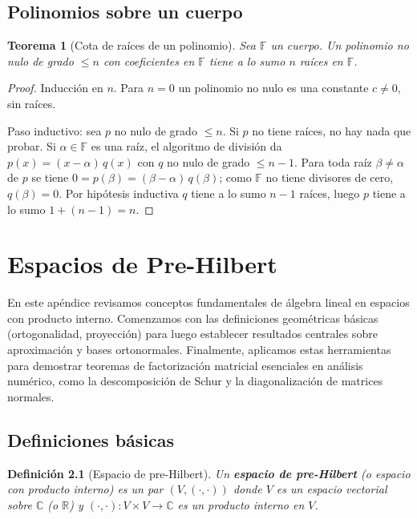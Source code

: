 \documentclass[a4paper,11pt]{report}
\newtheorem{theorem}{Teorema}[chapter]
\newtheorem{definition}[theorem]{Definición}
\begin{document}
\section{Polinomios sobre un cuerpo}

\begin{theorem}[Cota de raíces de un polinomio]\label{thm:raices_polinomio}
Sea $\mathbb{F}$ un cuerpo.  Un polinomio no nulo de grado $\leq n$ con coeficientes en $\mathbb{F}$ tiene a lo sumo $n$ raíces en $\mathbb{F}$.
\end{theorem}

\begin{proof}
Inducción en $n$.  Para $n=0$ un polinomio no nulo es una constante $c\neq 0$, sin raíces.

Paso inductivo: sea $p$ no nulo de grado $\leq n$.  Si $p$ no tiene raíces, no hay nada que probar.  Si $\alpha\in\mathbb{F}$ es una raíz, el algoritmo de división da $p(x)=(x-\alpha)\,q(x)$ con $q$ no nulo de grado $\leq n-1$.  Para toda raíz $\beta\neq\alpha$ de $p$ se tiene $0=p(\beta)=(\beta-\alpha)\,q(\beta)$; como $\mathbb{F}$ no tiene divisores de cero, $q(\beta)=0$.  Por hipótesis inductiva $q$ tiene a lo sumo $n-1$ raíces, luego $p$ tiene a lo sumo $1+(n-1)=n$.
\end{proof}


\chapter{Espacios de Pre-Hilbert}

En este apéndice revisamos conceptos fundamentales de álgebra lineal en espacios con producto interno. Comenzamos con las definiciones geométricas básicas (ortogonalidad, proyección) para luego establecer resultados centrales sobre aproximación y bases ortonormales. Finalmente, aplicamos estas herramientas para demostrar teoremas de factorización matricial esenciales en análisis numérico, como la descomposición de Schur y la diagonalización de matrices normales.

\section{Definiciones básicas}

\begin{definition}[Espacio de pre-Hilbert]
Un \textbf{espacio de pre-Hilbert} (o espacio con producto interno) es un par $(V, (\cdot,\cdot))$ donde $V$ es un espacio vectorial sobre $\mathbb{C}$ (o $\mathbb{R}$) y $(\cdot,\cdot) : V \times V \to \mathbb{C}$ es un producto interno en $V$.
\end{definition}
\end{document}
